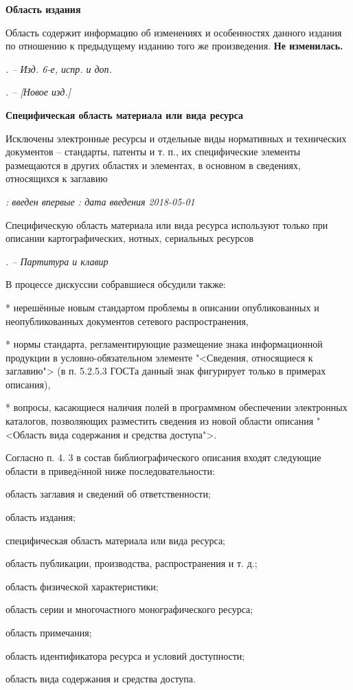 \textbf{Область издания}

Область содержит информацию об изменениях и особенностях данного издания по отношению к предыдущему изданию того же произведения. \textbf{Не изменилась.}

\textsl{. -- Изд. 6-е, испр. и доп.}

\textsl{. -- {[}Новое изд.{]}}

\textbf{Специфическая область материала или вида ресурса}

Исключены электронные ресурсы и отдельные виды нормативных и технических документов -- стандарты, патенты и т. п., их специфические элементы размещаются в других областях и элементах, в основном в сведениях, относящихся к заглавию

\textsl{: введен впервые : дата введения 2018-05-01}

Специфическую область материала или вида ресурса используют только при описании картографических, нотных, сериальных ресурсов

\textsl{. -- Партитура и клавир}

\vspace{2cm}

В процессе дискуссии собравшиеся обсудили также:

* нерешённые новым стандартом проблемы в описании опубликованных и неопубликованных документов сетевого распространения,

* нормы стандарта, регламентирующие размещение знака информационной продукции в условно-обязательном элементе "<Сведения, относящиеся к заглавию"> (в п. 5.2.5.3 ГОСТа данный знак фигурирует только в примерах описания),

* вопросы, касающиеся наличия полей в программном обеспечении электронных каталогов, позволяющих разместить сведения из новой области описания "<Область вида содержания и средства доступа">.

\vspace{2cm}


Согласно п. 4. 3 в состав библиографического описания входят следующие области в привед\"eнной ниже последовательности:

\begin{cutelist}
    \item область заглавия и сведений об ответственности;
    \item область издания;
    \item специфическая область материала или вида ресурса;
    \item область публикации, производства, распространения и т. д.;
    \item область физической характеристики;
    \item область серии и многочастного монографического ресурса;
    \item область примечания;
    \item область идентификатора ресурса и условий доступности;
    \item область вида содержания и средства доступа.
\end{cutelist}

